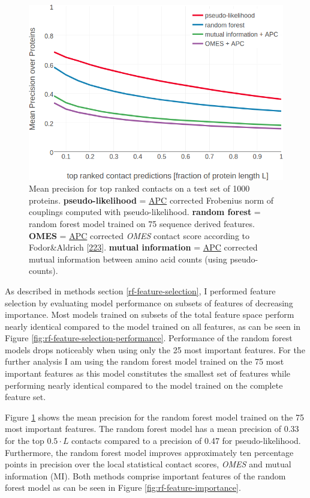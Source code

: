 \documentclass[11pt,a4paper,twoside]{book}
\theoremstyle{definition}
\theoremstyle{definition}
\theoremstyle{remark}
\begin{document}
\begin{figure}
\includegraphics[width=0.9\linewidth]{img/random_forest_contact_prior/precision_vs_rank_notitle} \caption{Mean precision for top ranked contacts on a
test set of 1000 proteins. \textbf{pseudo-likelihood} =
\protect\hyperlink{abbrev}{APC} corrected Frobenius norm of couplings
computed with pseudo-likelihood. \textbf{random forest} = random forest
model trained on 75 sequence derived features. \textbf{OMES} =
\protect\hyperlink{abbrev}{APC} corrected \emph{OMES} contact score
according to Fodor\&Aldrich
{[}\protect\hyperlink{ref-Fodor2004a}{223}{]}. \textbf{mutual
information} = \protect\hyperlink{abbrev}{APC} corrected mutual
information between amino acid counts (using pseudo-counts).}\label{fig:performance-rf}
\end{figure}

As described in methods section \ref{rf-feature-selection}, I performed
feature selection by evaluating model performance on subsets of features
of decreasing importance. Most models trained on subsets of the total
feature space perform nearly identical compared to the model trained on
all features, as can be seen in Figure
\ref{fig:rf-feature-selection-performance}. Performance of the random
forest models drops noticeably when using only the 25 most important
features. For the further analysis I am using the random forest model
trained on the 75 most important features as this model constitutes the
smallest set of features while performing nearly identical compared to
the model trained on the complete feature set.

Figure \ref{fig:performance-rf} shows the mean precision for the random
forest model trained on the 75 most important features. The random
forest model has a mean precision of 0.33 for the top \(0.5\cdot L\)
contacts compared to a precision of 0.47 for pseudo-likelihood.
Furthermore, the random forest model improves approximately ten
percentage points in precision over the local statistical contact
scores, \emph{OMES} and mutual information (MI). Both methods comprise
important features of the random forest model as can be seen in Figure
\ref{fig:rf-feature-importance}.
\end{document}

